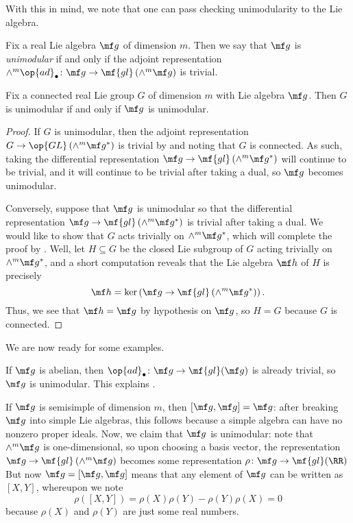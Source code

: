 \documentclass[notes.tex]{subfiles}
\begin{document}
With this in mind, we note that one can pass checking unimodularity to the Lie algebra.
\begin{definition}[unimodular]
	Fix a real Lie algebra $\mf g$ of dimension $m$. Then we say that $\mf g$ is \textit{unimodular} if and only if the adjoint representation $\land^m\op{ad}_\bullet\colon\mf g\to\mf{gl}\left(\land^m\mf g\right)$ is trivial.
\end{definition}
\begin{proposition}
	Fix a connected real Lie group $G$ of dimension $m$ with Lie algebra $\mf g$. Then $G$ is unimodular if and only if $\mf g$ is unimodular.
\end{proposition}
\begin{proof}
	If $G$ is unimodular, then the adjoint representation $G\to\op{GL}\left(\land^m\mf g^*\right)$ is trivial by  and noting that $G$ is connected. As such, taking the differential representation $\mf g\to\mf{gl}\left(\land^m\mf g^*\right)$ will continue to be trivial, and it will continue to be trivial after taking a dual, so $\mf g$ becomes unimodular.

	Conversely, suppose that $\mf g$ is unimodular so that the differential representation $\mf g\to\mf{gl}\left(\land^m\mf g^*\right)$ is trivial after taking a dual. We would like to show that $G$ acts trivially on $\land^m\mf g^*$, which will complete the proof by . Well, let $H\subseteq G$ be the closed Lie subgroup of $G$ acting trivially on $\land^m\mf g^*$, and a short computation reveals that the Lie algebra $\mf h$ of $H$ is precisely
	\[\mf h=\ker\left(\mf g\to\mf{gl}\left(\land^m\mf g^*\right)\right).\]
	Thus, we see that $\mf h=\mf g$ by hypothesis on $\mf g$, so $H=G$ because $G$ is connected.
\end{proof}
We are now ready for some examples.
\begin{example}
	If $\mf g$ is abelian, then $\op{ad}_\bullet\colon\mf g\to\mf{gl}(\mf g)$ is already trivial, so $\mf g$ is unimodular. This explains .
\end{example}
\begin{example} \label{ex:ss-is-unimodular}
	If $\mf g$ is semisimple of dimension $m$, then $[\mf g,\mf g]=\mf g$: after breaking $\mf g$ into simple Lie algebras, this follows because a simple algebra can have no nonzero proper ideals. Now, we claim that $\mf g$ is unimodular: note that $\land^m\mf g$ is one-dimensional, so upon choosing a basis vector, the representation $\mf g\to\mf{gl}\left(\land^m\mf g\right)$ becomes some representation $\rho\colon\mf g\to\mf{gl}(\RR)$ But now $\mf g=[\mf g,\mf g]$ means that any element of $\mf g$ can be written as $[X,Y]$, whereupon we note
	\[\rho([X,Y])=\rho(X)\rho(Y)-\rho(Y)\rho(X)=0\]
	because $\rho(X)$ and $\rho(Y)$ are just some real numbers.
\end{example}
\end{document}
